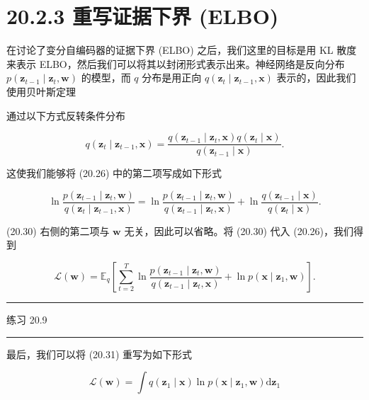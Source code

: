 \documentclass[10pt]{report}
\newcommand{\HRule}{\begin{center}\rule{0.9\linewidth}{0.2mm}\end{center}}
\begin{document}
\section*{20.2.3 重写证据下界 (ELBO)}

在讨论了变分自编码器的证据下界 (ELBO) 之后，我们这里的目标是用 KL 散度来表示 ELBO，然后我们可以将其以封闭形式表示出来。神经网络是反向分布 \(p\left( {{\mathbf{z}}_{t - 1} \mid  {\mathbf{z}}_{t},\mathbf{w}}\right)\) 的模型，而 \(q\) 分布是用正向 \(q\left( {{\mathbf{z}}_{t} \mid  {\mathbf{z}}_{t - 1},\mathbf{x}}\right)\) 表示的，因此我们使用贝叶斯定理

通过以下方式反转条件分布

\[
q\left( {{\mathbf{z}}_{t} \mid  {\mathbf{z}}_{t - 1},\mathbf{x}}\right)  = \frac{q\left( {{\mathbf{z}}_{t - 1} \mid  {\mathbf{z}}_{t},\mathbf{x}}\right) q\left( {{\mathbf{z}}_{t} \mid  \mathbf{x}}\right) }{q\left( {{\mathbf{z}}_{t - 1} \mid  \mathbf{x}}\right) }. \tag{20.29}
\]

这使我们能够将 (20.26) 中的第二项写成如下形式

\[
\ln \frac{p\left( {{\mathbf{z}}_{t - 1} \mid  {\mathbf{z}}_{t},\mathbf{w}}\right) }{q\left( {{\mathbf{z}}_{t} \mid  {\mathbf{z}}_{t - 1},\mathbf{x}}\right) } = \ln \frac{p\left( {{\mathbf{z}}_{t - 1} \mid  {\mathbf{z}}_{t},\mathbf{w}}\right) }{q\left( {{\mathbf{z}}_{t - 1} \mid  {\mathbf{z}}_{t},\mathbf{x}}\right) } + \ln \frac{q\left( {{\mathbf{z}}_{t - 1} \mid  \mathbf{x}}\right) }{q\left( {{\mathbf{z}}_{t} \mid  \mathbf{x}}\right) }. \tag{20.30}
\]

(20.30) 右侧的第二项与 \(\mathbf{w}\) 无关，因此可以省略。将 (20.30) 代入 (20.26)，我们得到

\[
\mathcal{L}\left( \mathbf{w}\right)  = {\mathbb{E}}_{q}\left\lbrack  {\mathop{\sum }\limits_{{t = 2}}^{T}\ln \frac{p\left( {{\mathbf{z}}_{t - 1} \mid  {\mathbf{z}}_{t},\mathbf{w}}\right) }{q\left( {{\mathbf{z}}_{t - 1} \mid  {\mathbf{z}}_{t},\mathbf{x}}\right) } + \ln p\left( {\mathbf{x} \mid  {\mathbf{z}}_{1},\mathbf{w}}\right) }\right\rbrack  . \tag{20.31}
\]

\HRule

练习 20.9

\HRule

最后，我们可以将 (20.31) 重写为如下形式

\[
\mathcal{L}\left( \mathbf{w}\right)  = \int q\left( {{\mathbf{z}}_{1} \mid  \mathbf{x}}\right) \ln p\left( {\mathbf{x} \mid  {\mathbf{z}}_{1},\mathbf{w}}\right) \mathrm{d}{\mathbf{z}}_{1}
\]
\end{document}
